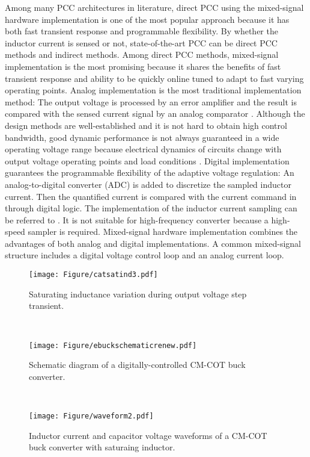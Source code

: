 Among many PCC architectures in literature, direct PCC using the mixed-signal hardware implementation is one of the most popular approach because it has both fast transient response and programmable flexibility. By whether the inductor current is sensed or not, state-of-the-art PCC can be direct PCC methods and indirect methods. Among direct PCC methods, mixed-signal implementation is the most promising because it shares the benefits of fast transient response and ability to be quickly online tuned to adapt to fast varying operating points. Analog implementation is the most traditional implementation method: The output voltage is processed by an error amplifier and the result is compared with the sensed current signal by an analog comparator \cite{Kaz2006tcs}. Although the design methods are well-established and it is not hard to obtain high control bandwidth, good dynamic performance is not always guaranteed in a wide operating voltage range because {\color{red} electrical dynamics} of circuits change with output voltage operating points and load conditions \cite{erikson2007}. Digital implementation guarantees the programmable flexibility of the adaptive voltage regulation: An analog-to-digital converter (ADC) is added to discretize the sampled inductor current. Then the quantified current is compared with the current command in through digital logic. The implementation of the inductor current sampling can be referred to \cite{Lilee2008APEC}. It is not suitable for high-frequency converter because a high-speed sampler is required. Mixed-signal hardware implementation \cite{Prodic2011tcs} \cite{Huerta2012} combines the advantages of both analog and digital implementations. A common mixed-signal structure includes a digital voltage control loop and an analog current loop.

\begin{figure}
\begin{minipage}{0.32\textwidth}
    \centering
    \texttt{[image: Figure/catsatind3.pdf]}
    \caption{ \label{catonsatind} Saturating inductance variation during output voltage step transient.}
\end{minipage}
~
\begin{minipage}{0.32\textwidth}
    \centering
    \texttt{[image: Figure/ebuckschematicrenew.pdf]}
  \caption{  \label{circuitdiagram} Schematic diagram of a digitally-controlled CM-COT buck converter.}
\end{minipage}
~
\begin{minipage}{0.32\textwidth}
    \centering
    \texttt{[image: Figure/waveform2.pdf]}
    \caption{\label{eboostderivation} Inductor current and capacitor voltage waveforms of a CM-COT buck converter with saturaing inductor.}
\end{minipage}
\end{figure}


